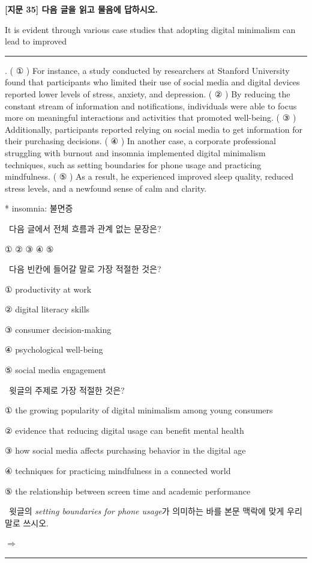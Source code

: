 \documentclass[11pt,a4paper]{article}
\newcommand{\qno}[1]{\par\vspace{8pt}\noindent{\sffamily\bfseries #1.}\ }
\newcommand{\instr}[1]{{\sffamily #1}\par\vspace{3pt}}
\begin{document}
\begin{center}
{\fontsize{15}{17}\selectfont\sffamily\bfseries [지문 35] 다음 글을 읽고 물음에 답하시오.}
\end{center}
\vspace{4pt}

\begin{pbox}
It is evident through various case studies that adopting digital minimalism can lead to
improved \rule{2cm}{0.4pt}. ( ① ) For instance, a study conducted by researchers at
Stanford University found that participants who limited their use of social media and digital
devices reported lower levels of stress, anxiety, and depression. ( ② ) By reducing the
constant stream of information and notifications, individuals were able to focus more on
meaningful interactions and activities that promoted well-being. ( ③ ) Additionally,
participants reported relying on social media to get information for their purchasing
decisions. ( ④ ) In another case, a corporate professional struggling with burnout and
insomnia implemented digital minimalism techniques, such as setting boundaries for phone
usage and practicing mindfulness. ( ⑤ ) As a result, he experienced improved sleep quality,
reduced stress levels, and a newfound sense of calm and clarity.

\vspace{4pt}
\noindent\footnotesize{* insomnia: 불면증}
\end{pbox}

\bigskip

\qno{1}\instr{다음 글에서 전체 흐름과 관계 없는 문장은?}
\begin{choices}
\item ① \quad ② \quad ③ \quad ④ \quad ⑤
\end{choices}

\bigskip

\qno{2}\instr{다음 빈칸에 들어갈 말로 가장 적절한 것은?}
\begin{choices}
\item ① productivity at work
\item ② digital literacy skills
\item ③ consumer decision-making
\item ④ psychological well-being
\item ⑤ social media engagement
\end{choices}

\bigskip

\qno{3}\instr{윗글의 주제로 가장 적절한 것은?}
\begin{choices}
\item ① the growing popularity of digital minimalism among young consumers
\item ② evidence that reducing digital usage can benefit mental health
\item ③ how social media affects purchasing behavior in the digital age
\item ④ techniques for practicing mindfulness in a connected world
\item ⑤ the relationship between screen time and academic performance
\end{choices}

\qno{4}\instr{[서술형] 윗글의 \textit{setting boundaries for phone usage}가 의미하는 바를 본문 맥락에 맞게 우리말로 쓰시오.}
\par\vspace{4pt}\noindent
$\Rightarrow$ \rule{\linewidth}{0.4pt}
\end{document}
